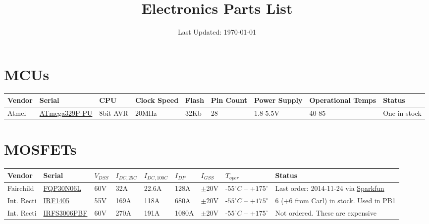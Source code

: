\documentclass[a4paper,landscape]{article}
\title{Electronics Parts List}
\date{Last Updated: \today}
\begin{document}
  \pagestyle{fancy}
  \maketitle
  \lhead{} \rhead{}
\section{MCUs}
    {\footnotesize
    \hspace*{-6cm}\begin{tabular}{lllllllll}
    \rowcolor{gray!50}
    \hline
    \textbf{Vendor}
    & \textbf{Serial}
    & \textbf{CPU}
    & \textbf{Clock Speed}
    & \textbf{Flash}
    & \textbf{Pin Count}
    & \textbf{Power Supply}
    & \textbf{Operational Temps}
    & \textbf{Status}\\
    \hline
  Atmel
      & \href{http://www.atmel.com/devices/atmega328p.aspx}{ATmega329P-PU}
      & 8bit AVR
      & 20MHz
      & 32Kb
      & 28
      & 1.8-5.5V
      & 40-85
      & One in stock\\
  \hline
  \end{tabular}}

\section{MOSFETs}
    {\footnotesize
    \hspace*{-6cm}\begin{tabular}{lllllllll}
    \rowcolor{gray!50}
    \hline
    \textbf{Vendor}
    & \textbf{Serial}
    & \textbf{$V_{DSS}$}
    & \textbf{$I_{DC,25C}$}
    & \textbf{$I_{DC,100C}$}
    & \textbf{$I_{DP}$}
    & \textbf{$I_{GSS}$}
    & \textbf{$T_{oper}$}
    & \textbf{Status}\\
    \hline
      Fairchild
      & \href{http://dlnmh9ip6v2uc.cloudfront.net/datasheets/Components/General/FQP30N06L.pdf}{FQP30N06L}
      & 60V
      & 32A
      & 22.6A
      & 128A
      & $\pm$20V
      & -$55^{\circ}C$ -- +$175^{\circ}$
      & Last order: 2014-11-24 via \href{https://www.sparkfun.com/products/10213}{Sparkfun}\\
      Int. Recti
      &
      \href{http://pdf1.alldatasheet.com/datasheet-pdf/view/68121/IRF/IRF1405.html}{IRF1405}
      & 55V
      & 169A
      & 118A
      & 680A
      & $\pm$20V
      & -$55^{\circ}C$ -- +$175^{\circ}$
      & 6 (+6 from Carl) in stock. Used in PB1\\
      Int. Recti
      & \href{http://www.irf.com/product-info/datasheets/data/irfs3006pbf.pdf}{IRFS3006PBF}
      & 60V
      & 270A
      & 191A
      & 1080A
      & $\pm$20V
      & -$55^{\circ}C$ -- +$175^{\circ}$
      & Not ordered. These are expensive\\
  \hline
  \end{tabular}}
\end{document}
